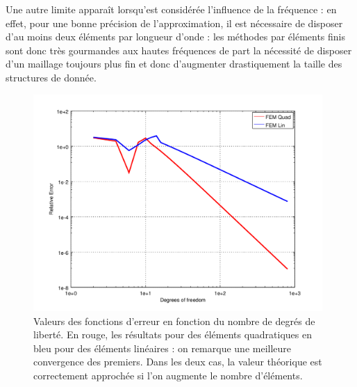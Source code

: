 Une autre limite apparaît lorsqu'est considérée l'influence de la fréquence : en effet, pour une bonne précision de
l'approximation, il est nécessaire de disposer d'au moins deux éléments par longueur d'onde : les méthodes par éléments
finis sont donc très gourmandes aux hautes fréquences de part la nécessité de disposer d'un maillage toujours plus fin
et donc d'augmenter drastiquement la taille des structures de donnée.


\begin{figure}[!ht]
	\centering
	\includegraphics[width=11cm]{part1/figs/FEM/simuls_1D/convergence.png}
	\caption{\label{fig:FEM1D:simuls:convergence}Valeurs des fonctions d'erreur en fonction du nombre de degrés de
	liberté. En rouge, les résultats pour des éléments quadratiques en bleu pour des éléments linéaires : on
	remarque une meilleure convergence des premiers. Dans les deux cas, la valeur théorique est correctement approchée
	si l'on augmente le nombre d'éléments.}
\end{figure}

